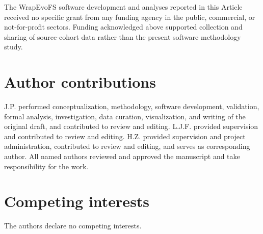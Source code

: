 The WrapEvoFS software development and analyses reported in this Article received no specific grant from any funding agency in the public, commercial, or not-for-profit sectors. Funding acknowledged above supported collection and sharing of source-cohort data rather than the present software methodology study.

\FloatBarrier
\section{Author contributions}

J.P. performed conceptualization, methodology, software development, validation, formal analysis, investigation, data curation, visualization, and writing of the original draft, and contributed to review and editing. L.J.F. provided supervision and contributed to review and editing. H.Z. provided supervision and project administration, contributed to review and editing, and serves as corresponding author. All named authors reviewed and approved the manuscript and take responsibility for the work.

\FloatBarrier
\section{Competing interests}

The authors declare no competing interests.

\FloatBarrier
